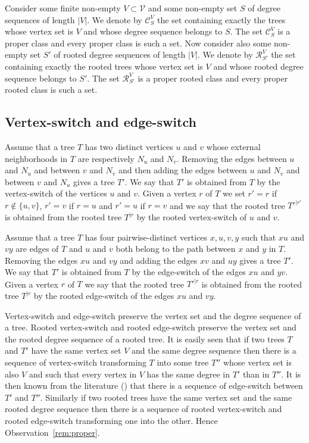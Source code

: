 \documentclass[11 pt]{modarticle}
\newcommand{\vset}{\mathcal{V}}
\newcommand{\size}[1]{|#1|}
\newcommand{\rtree}[2]{{#1}^{\lvert #2}}
\newcommand{\tclass}{\mathcal{C}}
\newcommand{\rtclass}{\mathcal{R}}
\newcommand{\pclass}[2]{\tclass^{#1}_{#2}}
\newcommand{\rpclass}[2]{\rtclass^{#1}_{#2}}
\begin{document}
Consider some finite non-empty $V \subset \vset$ and some non-empty set $S$ of degree sequences of length $\size{V}$. We denote by $\pclass{V}{S}$ the set containing exactly the trees whose vertex set is $V$ and whose degree sequence belongs to $S$. The set $\pclass{V}{S}$ is a proper class and every proper class is such a set. Now consider also some non-empty set $S'$ of rooted degree sequences of length $\size{V}$. We denote by $\rpclass{V}{S'}$ the set containing exactly the rooted trees whose vertex set is $V$ and whose rooted degree sequence belongs to $S'$. The set $\rpclass{V}{S'}$ is a proper rooted class and every proper rooted class is such a set.


\subsection{Vertex-switch and edge-switch}

\begin{defi}
Assume that a tree $T$ has two distinct vertices $u$ and $v$ whose external neighborhoods in $T$ are respectively $N_u$ and $N_v$. Removing the edges between $u$ and $N_u$ and between $v$ and $N_v$ and then adding the edges between $u$ and $N_v$ and between $v$ and $N_u$ gives a tree $T'$. We say that $T'$ is obtained from $T$ by the vertex-switch of the vertices $u$ and $v$. Given a vertex $r$ of $T$ we set $r' = r$ if $r \notin \{u,v\}$, $r' = v$ if $r = u$ and $r' = u$ if $r = v$ and we say that the rooted tree $\rtree{T'}{r'}$ is obtained from the rooted tree $\rtree{T}{r}$ by the rooted vertex-switch of $u$ and $v$.
\end{defi}

\begin{defi}
Assume that a tree $T$ has four pairwise-distinct vertices $x,u,v,y$ such that $xu$ and $vy$ are edges of $T$ and $u$ and $v$ both belong to the path between $x$ and $y$ in $T$. Removing the edges $xu$ and $vy$ and adding the edges $xv$ and $uy$ gives a tree $T'$. We say that $T'$ is obtained from $T$ by the edge-switch of the edges $xu$ and $yv$. Given a vertex $r$ of $T$ we say that the rooted tree $\rtree{T'}{r}$ is obtained from the rooted tree $\rtree{T}{r}$ by the rooted edge-switch of the edges $xu$ and $vy$.
\end{defi}

Vertex-switch and edge-switch preserve the vertex set and the degree sequence of a tree. Rooted vertex-switch and rooted edge-switch preserve the vertex set and the rooted degree sequence of a rooted tree. It is easily seen that if two trees $T$ and $T'$ have the same vertex set $V$ and the same degree sequence then there is a sequence of vertex-switch transforming $T$ into some tree $T''$ whose vertex set is also $V$ and such that every vertex in $V$ has the same degree in $T'$ than in $T''$. It is then known from the literature (\cite[Theorem~4.3]{switch}) that there is a sequence of edge-switch between $T'$ and $T''$. Similarly if two rooted trees have the same vertex set and the same rooted degree sequence then there is a sequence of rooted vertex-switch and rooted edge-switch transforming one into the other. Hence Observation~\ref{rem:proper}.
\end{document}
